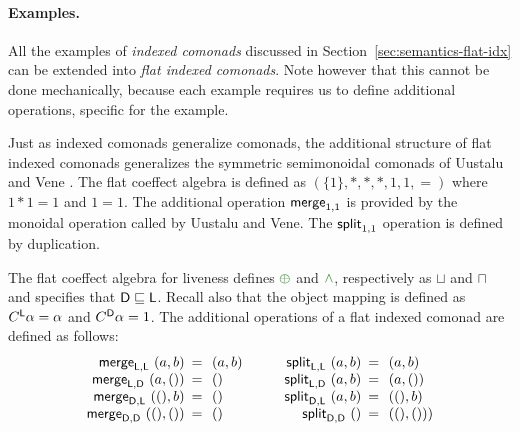 \paragraph{Examples.}
All the examples of \emph{indexed comonads} discussed in Section~\ref{sec:semantics-flat-idx} can
be extended into \emph{flat indexed comonads}. Note however that this cannot be done mechanically,
because each example requires us to define additional operations, specific for the example.

\begin{example}
Just as indexed comonads generalize co\-monads, the additional structure of
flat indexed comonads generalizes the symmetric semimonoidal comonads of Uustalu
and Vene \cite{comonads-notions}. The flat coeffect algebra is defined as $(\{1\}, \ast, \ast, \ast, 1, 1, =)$
where $1\ast1=1$ and $1=1$. The additional operation $\textnormal{\sffamily merge}_{1,1}$ is provided by the
monoidal operation called  by Uustalu and Vene. The $\textnormal{\sffamily split}_{1,1}$ operation
is defined by duplication.
\end{example}

\begin{example}
\label{thm:semantics-indexed-opt}

The flat coeffect algebra for liveness defines $\cpar$ and $\czip$, respectively as $\sqcup$ and $\sqcap$
and specifies that $\textnormal{\sffamily D} \sqsubseteq \textnormal{\sffamily L}$. Recall also that the object mapping is defined
as $C^{\textnormal{\sffamily L}}\alpha = \alpha$ and $C^{\textnormal{\sffamily D}}\alpha = 1$. The additional operations
of a flat indexed comonad are defined as follows:
%
\begin{equation*}
\begin{array}{rcl}
\ident{merge}_{\ident{L}, \ident{L}}~(a, b) &\narrow{=}& (a, b)\\
\ident{merge}_{\ident{L}, \ident{D}}~(a, ()) &\narrow{=}& ()\\
\ident{merge}_{\ident{D}, \ident{L}}~((), b) &\narrow{=}& ()\\
\ident{merge}_{\ident{D}, \ident{D}}~((), ()) &\narrow{=}& ()\\
\end{array}
\qquad
\begin{array}{rcl}
\ident{split}_{\ident{L}, \ident{L}}~(a, b) &\narrow{=}& (a, b)\\
\ident{split}_{\ident{L}, \ident{D}}~(a, b) &\narrow{=}& (a, ())\\
\ident{split}_{\ident{D}, \ident{L}}~(a, b) &\narrow{=}& ((), b)\\
\ident{split}_{\ident{D}, \ident{D}}~() &\narrow{=}& ((), ()))\\
\end{array}
\end{equation*}
\end{example}

